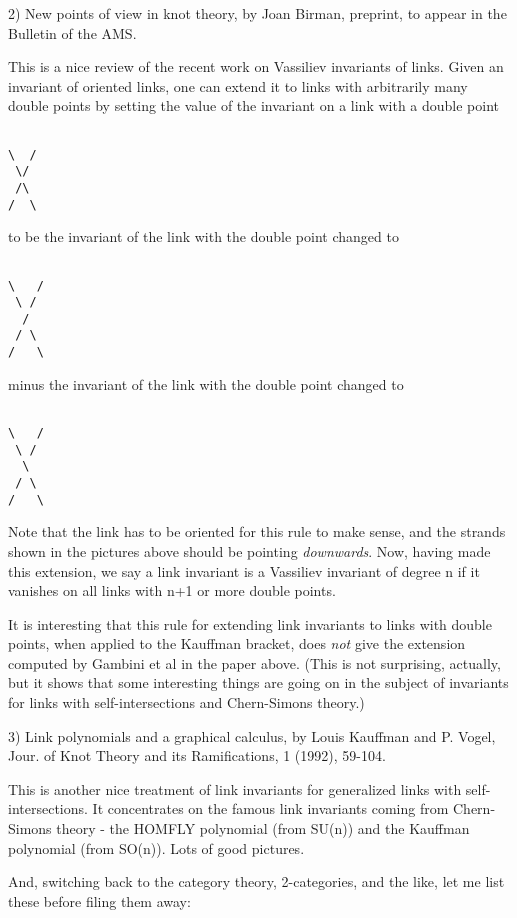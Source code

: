 2)  New points of view in knot theory, by Joan Birman, preprint, to
appear in the Bulletin of the AMS.

This is a nice review of the recent work on Vassiliev invariants
of links.  Given an invariant of oriented links, one can extend
it to links with arbitrarily many double points by setting
the value of the invariant on a link with a double point


\begin{verbatim}

\  /
 \/
 /\
/  \
\end{verbatim}
    
to be the invariant of the link with the double point changed to


\begin{verbatim}

\   /
 \ /
  /
 / \
/   \
\end{verbatim}
    
minus the invariant of the link with the double point changed to


\begin{verbatim}

\   /
 \ /
  \
 / \
/   \
\end{verbatim}
    
Note that the link has to be oriented for this rule to make sense,
and the strands shown in the pictures above should be pointing
\emph{downwards}.   Now, having made this extension, we say a link
invariant is a Vassiliev invariant of degree n if it vanishes
on all links with n+1 or more double points.  

It is interesting that this rule for extending link invariants
to links with double points, when applied to the Kauffman bracket,
does \emph{not} give the extension computed by Gambini et al in the paper
above.  (This is not surprising, actually, but it shows that some
interesting things are going on in the subject of invariants for
links with self-intersections and Chern-Simons theory.)  

3)  Link polynomials and a graphical calculus, by Louis Kauffman and
P. Vogel, Jour. of Knot Theory and its Ramifications, 1 (1992), 59-104.

This is another nice treatment of link invariants for generalized
links with self-intersections.  It concentrates on the famous
link invariants coming from Chern-Simons theory - the HOMFLY
polynomial (from SU(n)) and the Kauffman polynomial (from SO(n)).
Lots of good pictures.

And, switching back to the category theory, 2-categories, and the like,
let me list these before filing them away:

